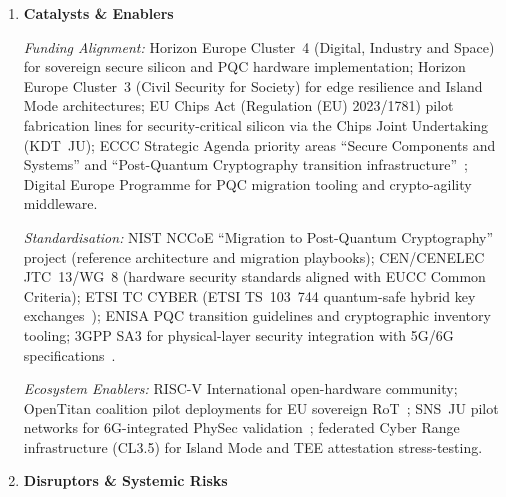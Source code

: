 \begin{enumerate}
\item \textbf{Catalysts \& Enablers}

\textit{Funding Alignment:}
Horizon Europe Cluster~4 (Digital, Industry and Space) for sovereign secure silicon and
PQC hardware implementation; Horizon Europe Cluster~3 (Civil Security for Society) for
edge resilience and Island Mode architectures; EU Chips Act (Regulation (EU) 2023/1781)
pilot fabrication lines for security-critical silicon via the Chips Joint Undertaking
(KDT~JU); ECCC Strategic Agenda priority areas ``Secure Components and Systems'' and
``Post-Quantum Cryptography transition infrastructure''~\cite{eccc}; Digital Europe
Programme for PQC migration tooling and crypto-agility middleware.

\textit{Standardisation:}
NIST NCCoE ``Migration to Post-Quantum Cryptography'' project (reference architecture
and migration playbooks); CEN/CENELEC JTC~13/WG~8 (hardware security standards aligned
with EUCC Common Criteria); ETSI TC CYBER (ETSI TS~103~744 quantum-safe hybrid key
exchanges~\cite{etsi103744}); ENISA PQC transition guidelines and cryptographic inventory
tooling; 3GPP SA3 for physical-layer security integration with 5G/6G
specifications~\cite{threeGPP33501}.

\textit{Ecosystem Enablers:}
RISC-V International open-hardware community; OpenTitan coalition pilot deployments
for EU sovereign RoT~\cite{opentitan}; SNS~JU pilot networks for 6G-integrated PhySec
validation~\cite{snsju}; federated Cyber Range infrastructure (CL3.5) for Island Mode
and TEE attestation stress-testing.

\item \textbf{Disruptors \& Systemic Risks}


\end{enumerate}

